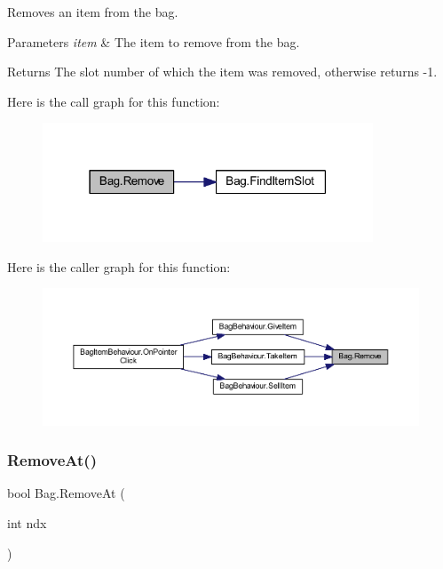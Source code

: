 Removes an item from the bag. 


\begin{DoxyParams}{Parameters}
{\em item} & The item to remove from the bag.\\
\hline
\end{DoxyParams}
\begin{DoxyReturn}{Returns}
The slot number of which the item was removed, otherwise returns -\/1.
\end{DoxyReturn}
Here is the call graph for this function\+:
\nopagebreak
\begin{figure}[H]
\begin{center}
\leavevmode
\includegraphics[width=279pt]{class_bag_a42a4319aa14d0b6bda7f91070ba57a47_cgraph}
\end{center}
\end{figure}
Here is the caller graph for this function\+:
\nopagebreak
\begin{figure}[H]
\begin{center}
\leavevmode
\includegraphics[width=350pt]{class_bag_a42a4319aa14d0b6bda7f91070ba57a47_icgraph}
\end{center}
\end{figure}
\mbox{\label{class_bag_a2f11a414bf3edfd7f380f30b71f34104}} 
\subsubsection{\texorpdfstring{RemoveAt()}{RemoveAt()}}
{\footnotesize\ttfamily bool Bag.\+Remove\+At (\begin{DoxyParamCaption}\item[{int}]{ndx }\end{DoxyParamCaption})}




